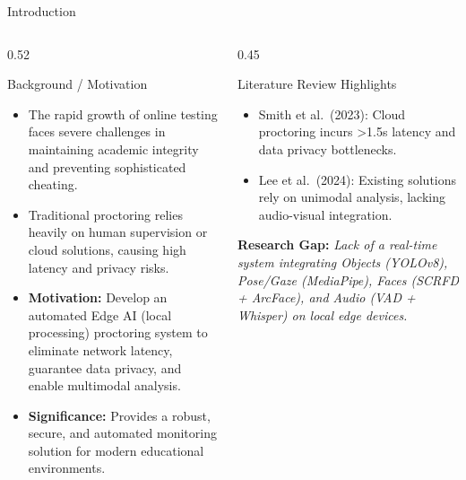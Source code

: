 \documentclass[aspectratio=169, 10pt]{beamer}
\begin{document}
\begin{frame}{Introduction}
  \begin{columns}[T]
    \begin{column}{0.52\textwidth}
      \begin{block}{Background / Motivation}
        \begin{itemize}
          \item The rapid growth of online testing faces severe challenges in maintaining academic integrity and preventing sophisticated cheating.
          \item Traditional proctoring relies heavily on human supervision or cloud solutions, causing high latency and privacy risks.
          \item \textbf{Motivation:} Develop an automated Edge AI (local processing) proctoring system to eliminate network latency, guarantee data privacy, and enable multimodal analysis.
          \item \textbf{Significance:} Provides a robust, secure, and automated monitoring solution for modern educational environments.
        \end{itemize}
      \end{block}
    \end{column}
    \begin{column}{0.45\textwidth}
      \begin{block}{Literature Review Highlights}
        \begin{itemize}
          \item Smith et al.\ (2023): Cloud proctoring incurs >1.5s latency and data privacy bottlenecks.\cite{ref1}
          \item Lee et al.\ (2024): Existing solutions rely on unimodal analysis, lacking audio-visual integration.\cite{ref2}
        \end{itemize}
        \vspace{0.5em}
        \textbf{\textcolor{MLIOTcoral}{Research Gap:}}
        \textit{Lack of a real-time system integrating Objects (YOLOv8), Pose/Gaze (MediaPipe), Faces (SCRFD + ArcFace), and Audio (VAD + Whisper) on local edge devices.}
      \end{block}
    \end{column}
  \end{columns}
\end{frame}
\end{document}
